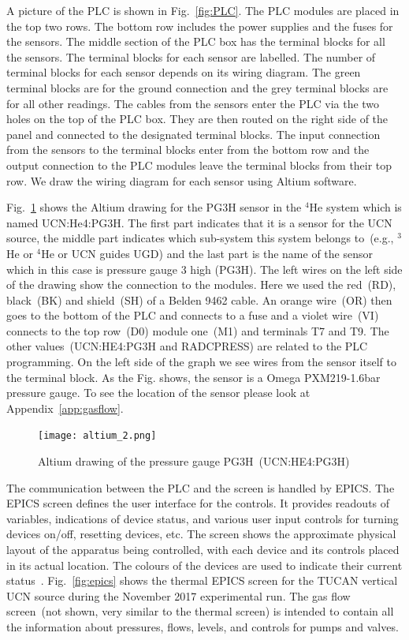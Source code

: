 A picture of the PLC is shown in Fig.~\ref{fig:PLC}. The PLC modules
are placed in the top two rows. The bottom row includes the power
supplies and the fuses for the sensors. The middle section of the PLC
box has the terminal blocks for all the sensors. The terminal blocks
for each sensor are labelled. The number of terminal blocks for each
sensor depends on its wiring diagram. The green terminal blocks are
for the ground connection and the grey terminal blocks are for all
other readings.  The cables from the sensors enter the PLC via the two
holes on the top of the PLC box. They are then routed on the right
side of the panel and connected to the designated terminal blocks. The
input connection from the sensors to the terminal blocks enter from
the bottom row and the output connection to the PLC modules leave the
terminal blocks from their top row. We draw the wiring diagram for
each sensor using Altium software.

Fig.~\ref{fig:altium} shows the Altium drawing for the PG3H sensor in
the $^4$He system which is named UCN:He4:PG3H. The first part
indicates that it is a sensor for the UCN source, the middle part
indicates which sub-system this system belongs to~(e.g., $^3$He or
$^4$He or UCN guides UGD) and the last part is the name of the sensor
which in this case is pressure gauge 3 high (PG3H). The left wires on
the left side of the drawing show the connection to the modules. Here
we used the red~(RD), black~(BK) and shield~(SH) of a Belden 9462
cable. An orange wire~(OR) then goes to the bottom of the PLC and
connects to a fuse and a violet wire~(VI) connects to the top row~(D0)
module one~(M1) and terminals T7 and T9. The other
values~(UCN:HE4:PG3H and RADCPRESS) are related to the PLC
programming. On the left side of the graph we see wires from the
sensor itself to the terminal block. As the Fig. shows, the sensor is
a Omega PXM219-1.6bar pressure gauge. To see the location of the
sensor please look at Appendix~\ref{app:gasflow}.

\begin{figure}[h!]
  \centering
  \texttt{[image: altium\_2.png]}
  \caption{Altium drawing of the pressure gauge PG3H~(UCN:HE4:PG3H) }
  \label{fig:altium}
\end{figure}



The communication between the PLC and the screen is handled by EPICS.
The EPICS screen defines the user interface for the controls. It
provides readouts of variables, indications of device status, and
various user input controls for turning devices on/off, resetting
devices, etc. The screen shows the approximate physical layout of the
apparatus being controlled, with each device and its controls placed
in its actual location. The colours of the devices are used to
indicate their current status~\cite{Sean_manual}. Fig.~\ref{fig:epics}
shows the thermal EPICS screen for the TUCAN vertical UCN source
during the November 2017 experimental run. The gas flow screen~(not
shown, very similar to the thermal screen) is intended to contain all
the information about pressures, flows, levels, and controls for pumps and
valves.

